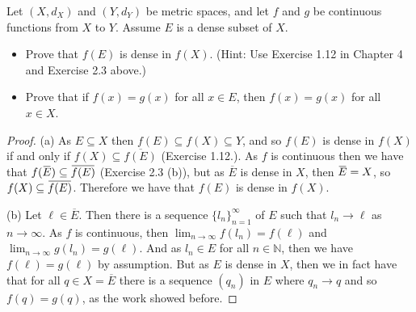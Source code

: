 \documentclass[oneside]{amsart}
\theoremstyle{definition}
\newcommand{\nn}{\mathbb N}
\newcommand{\overbar}[1]{\mkern 1.5mu\overline{\mkern-1.5mu#1\mkern-1.5mu}\mkern 1.5mu}
\begin{document}
 \begin{tcolorbox}[colback=black!5!white,colframe=black!75!black,title= Chapter 5; $\S 2.1$: Exercise $2.4.$]  Let $(X, d_X)$ and $(Y, d_Y)$ be metric spaces, and let $f$ and $g$ be continuous functions from $X$ to $Y$. Assume $E$ is a dense subset of $X$.
\begin{itemize}
	\item [(a)] Prove that $f(E)$ is dense in $f(X)$. (Hint: Use Exercise 1.12 in Chapter 4 and Exercise 2.3 above.)
	\item [(b)] Prove that if $f(x) = g(x)$ for all $x \in E$, then $f(x) = g(x)$ for all $x \in X$.
\end{itemize}
\tcblower 
\begin{proof} (a) As $E \subseteq X$ then $f(E) \subseteq f(X) \subseteq Y$, and so $f(E)$ is dense in $f(X)$ if and only if $ f(X) \subseteq \overline{f(E)}$ (Exercise 1.12.). As $f$ is continuous then we have that $f(\overbar{E}) \subseteq \overbar{f(E)}$ (Exercise 2.3 (b)), but as $\overline{E}$ is dense in $X$, then $\overbar{E} = X$, so $f(X) \subseteq \overbar{f(E)}$. Therefore we have that $f(E)$ is dense in $f(X)$. 

(b) Let $\ell \in \overline{E}$. Then there is a sequence $\{l_n \}_{n=1}^\infty$ of $E$ such that $l_n \to \ell$ as $n \to \infty$. As $f$ is continuous, then $\lim_{n \to \infty} f(l_n) = f( \ell )$ and $\lim_{n\to \infty} g(l_n) = g (\ell )$. And as $l_n \in E$ for all $n \in \nn$, then we have $f(\ell) = g(\ell)$ by assumption. But as $E$ is dense in $X$, then we in fact have that for all $ q \in X = \overline{E}$ there is a sequence $(q_n)$ in $E$ where $q_n \to q$ and so $f(q) = g(q)$, as the work showed before.
\end{proof}
\end{tcolorbox}
\end{document}
